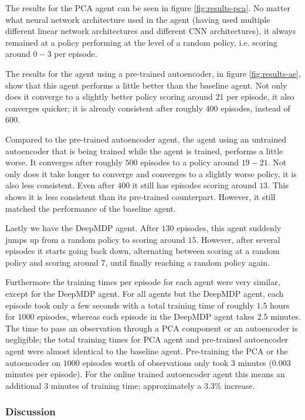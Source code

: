 The results for the PCA agent can be seen in figure \ref{fig:results-pca}. No matter what neural network architecture used in the agent (having used multiple different linear network architectures and different CNN architectures), it always remained at a policy performing at the level of a random policy, i.e. scoring around $0-3$ per episode.

The results for the agent using a pre-trained autoencoder, in figure \ref{fig:results-ae}, show that this agent performs a little better than the baseline agent. Not only does it converge to a slightly better policy scoring around $21$ per episode, it also converges quicker; it is already consistent after roughly $400$ episodes, instead of $600$. 

Compared to the pre-trained autoencoder agent, the agent using an untrained autoencoder that is being trained while the agent is trained, performs a little worse. It converges after roughly $500$ episodes to a policy around $19-21$. Not only does it take longer to converge and converges to a slightly worse policy, it is also less consistent. Even after $400$ it still has episodes scoring around $13$. This shows it is less consistent than its pre-trained counterpart. However, it still matched the performance of the baseline agent.

Lastly we have the DeepMDP agent. After $130$ episodes, this agent suddenly jumps up from a random policy to scoring around $15$. However, after several episodes it starts going back down, alternating between scoring at a random policy and scoring around $7$, until finally reaching a random policy again. 

Furthermore the training times per episode for each agent were very similar, except for the DeepMDP agent. For all agents but the DeepMDP agent, each episode took only a few seconds with a total training time of roughly $1.5$ hours for $1000$ episodes, whereas each episode in the DeepMDP agent takes $2.5$ minutes. The time to pass an observation through a PCA component or an autoencoder is negligible; the total training times for PCA agent and pre-trained autoencoder agent were almost identical to the baseline agent. Pre-training the PCA or the autoencoder on $1000$ episodes worth of observations only took $3$ minutes ($0.003$ minutes per episode). For the online trained autoencoder agent this means an additional $3$ minutes of training time; approximately a $3.3\%$ increase.

\subsubsection{Discussion}\label{research-discussion-pysc2}
